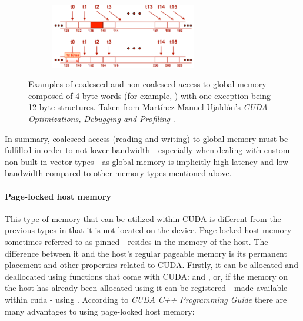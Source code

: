 \begin{figure}[ht!]
	\begin{subfigure}{\textwidth}
		\centering
		\hspace*{-0.8cm}
		\includegraphics[width=0.7\textwidth, keepaspectratio]{images/ch1/CUDA_global_memory_non-coalesced_access-2.png}
		\label{Sub-figure:theory-CUDA-global-memory-non-coalesced-access-2}
	\end{subfigure}
	\caption{Examples of coalesced and non-coalesced access to global memory composed of 4-byte words (for example, ) with one exception being 12-byte structures. Taken from Martínez Manuel Ujaldón's \emph{CUDA Optimizations, Debugging and Profiling} \cite{xUOrKLpxlGjvTonr}.}
	\label{Figure:theory-CUDA-global-memory-non-coalesced-access-examples}
\end{figure}

In summary, coalesced access (reading and writing) to global memory must be fulfilled in order to not lower bandwidth - especially when dealing with custom non-built-in vector types - as global memory is implicitly high-latency and low-bandwidth compared to other memory types mentioned above.

\paragraph{Page-locked host memory}\label{Paragraph:theory-CUDA-memory-management-page-locked-host-memory}
This type of memory that can be utilized within CUDA is different from the previous types in that it is not located on the device. Page-locked host memory - sometimes referred to as pinned - resides in the memory of the host. The difference between it and the host's regular pageable memory is its permanent placement and other properties related to CUDA. Firstly, it can be allocated and deallocated using functions that come with CUDA:  and , or, if the memory on the host has already been allocated using  it can be registered - made available within cuda - using . According to \emph{CUDA C++ Programming Guide} \cite{NVIDIAMay2022} there are many advantages to using page-locked host memory:


